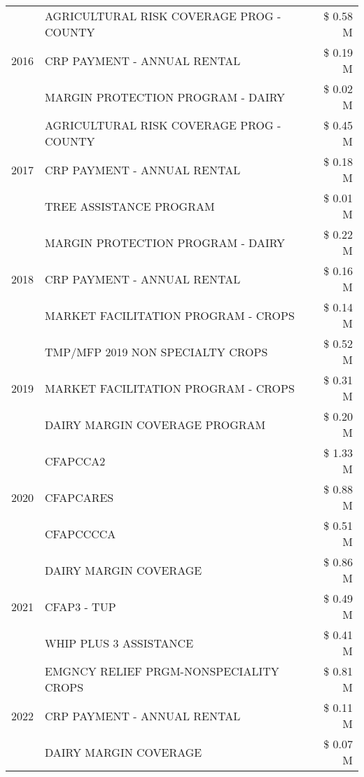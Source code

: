 \begin{tabular}{llr}
\cline{1-3}
\multirow[t]{3}{*}{2016} & AGRICULTURAL RISK COVERAGE PROG - COUNTY & \$ 0.58 M \\
 & CRP PAYMENT - ANNUAL RENTAL & \$ 0.19 M \\
 & MARGIN PROTECTION PROGRAM - DAIRY & \$ 0.02 M \\
\cline{1-3}
\multirow[t]{3}{*}{2017} & AGRICULTURAL RISK COVERAGE PROG - COUNTY & \$ 0.45 M \\
 & CRP PAYMENT - ANNUAL RENTAL & \$ 0.18 M \\
 & TREE ASSISTANCE PROGRAM & \$ 0.01 M \\
\cline{1-3}
\multirow[t]{3}{*}{2018} & MARGIN PROTECTION PROGRAM - DAIRY & \$ 0.22 M \\
 & CRP PAYMENT - ANNUAL RENTAL & \$ 0.16 M \\
 & MARKET FACILITATION PROGRAM - CROPS & \$ 0.14 M \\
\cline{1-3}
\multirow[t]{3}{*}{2019} & TMP/MFP 2019 NON SPECIALTY CROPS & \$ 0.52 M \\
 & MARKET FACILITATION PROGRAM - CROPS & \$ 0.31 M \\
 & DAIRY MARGIN COVERAGE PROGRAM & \$ 0.20 M \\
\cline{1-3}
\multirow[t]{3}{*}{2020} & CFAPCCA2 & \$ 1.33 M \\
 & CFAPCARES & \$ 0.88 M \\
 & CFAPCCCCA & \$ 0.51 M \\
\cline{1-3}
\multirow[t]{3}{*}{2021} & DAIRY MARGIN COVERAGE & \$ 0.86 M \\
 & CFAP3 - TUP & \$ 0.49 M \\
 & WHIP PLUS 3 ASSISTANCE & \$ 0.41 M \\
\cline{1-3}
\multirow[t]{3}{*}{2022} & EMGNCY RELIEF PRGM-NONSPECIALITY CROPS & \$ 0.81 M \\
 & CRP PAYMENT - ANNUAL RENTAL & \$ 0.11 M \\
 & DAIRY MARGIN COVERAGE & \$ 0.07 M \\
\cline{1-3}
\bottomrule
\end{tabular}

